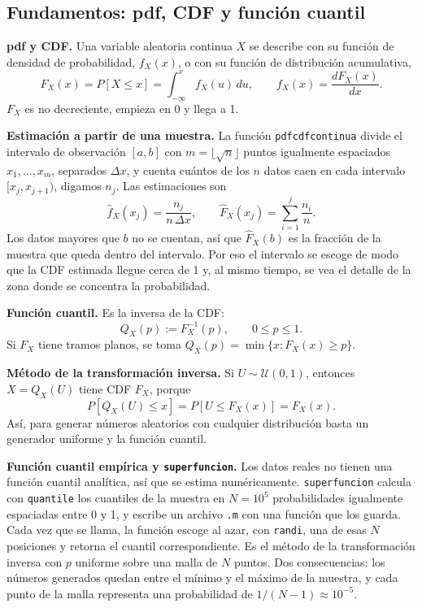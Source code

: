 \documentclass[12pt]{article}
\begin{document}
\subsection{Fundamentos: pdf, CDF y función cuantil}

\textbf{pdf y CDF.} Una variable aleatoria continua $X$ se describe con su función de densidad de probabilidad, $f_X(x)$, o con su función de distribución acumulativa,
\[
F_X(x)=P[X\leq x]=\int_{-\infty}^{x}f_X(u)\,du,\qquad f_X(x)=\frac{dF_X(x)}{dx}.
\]
$F_X$ es no decreciente, empieza en 0 y llega a 1.

\textbf{Estimación a partir de una muestra.} La función \texttt{pdfcdfcontinua} divide el intervalo de observación $[a,b]$ con $m=\lfloor\sqrt{n}\rfloor$ puntos igualmente espaciados $x_1,\dots,x_m$, separados $\Delta x$, y cuenta cuántos de los $n$ datos caen en cada intervalo $[x_j,x_{j+1})$, digamos $n_j$. Las estimaciones son
\[
\hat{f}_X(x_j)=\frac{n_j}{n\,\Delta x},\qquad \hat{F}_X(x_j)=\sum_{i=1}^{j}\frac{n_i}{n}.
\]
Los datos mayores que $b$ no se cuentan, así que $\hat{F}_X(b)$ es la fracción de la muestra que queda dentro del intervalo. Por eso el intervalo se escoge de modo que la CDF estimada llegue cerca de 1 y, al mismo tiempo, se vea el detalle de la zona donde se concentra la probabilidad.

\textbf{Función cuantil.} Es la inversa de la CDF:
\[
Q_X(p):=F_X^{-1}(p),\qquad 0\leq p\leq 1.
\]
Si $F_X$ tiene tramos planos, se toma $Q_X(p)=\min\{x: F_X(x)\geq p\}$.

\textbf{Método de la transformación inversa.} Si $U\sim\mathcal{U}(0,1)$, entonces $X=Q_X(U)$ tiene CDF $F_X$, porque
\[
P[Q_X(U)\leq x]=P[U\leq F_X(x)]=F_X(x).
\]
Así, para generar números aleatorios con cualquier distribución basta un generador uniforme y la función cuantil.

\textbf{Función cuantil empírica y \texttt{superfuncion}.} Los datos reales no tienen una función cuantil analítica, así que se estima numéricamente. \texttt{superfuncion} calcula con \texttt{quantile} los cuantiles de la muestra en $N=10^5$ probabilidades igualmente espaciadas entre 0 y 1, y escribe un archivo \texttt{.m} con una función que los guarda. Cada vez que se llama, la función escoge al azar, con \texttt{randi}, una de esas $N$ posiciones y retorna el cuantil correspondiente. Es el método de la transformación inversa con $p$ uniforme sobre una malla de $N$ puntos. Dos consecuencias: los números generados quedan entre el mínimo y el máximo de la muestra, y cada punto de la malla representa una probabilidad de $1/(N-1)\approx 10^{-5}$.
\end{document}
